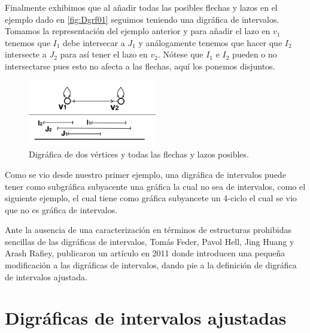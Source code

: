 Finalmente exhibimos que al añadir todas las posibles flechas y lazos en el
ejemplo dado en \cref{fig:Dgrf01} seguimos teniendo una digr\'afica de
intervalos. Tomamos la representaci\'on del ejemplo anterior y para añadir el
lazo en $v_1$ tenemos que $I_1$ debe intersecar a $J_1$ y an\'alogamente tenemos
que hacer que $I_2$ intersecte a $J_2$ para así tener el lazo en $v_2$. N\'otese
que $I_1$ e $I_2$ pueden o no intersectarse pues esto no afecta a las flechas,
aquí los ponemos disjuntos.

\begin{figure}[H]
  \centering
  \includegraphics[width=0.5\textwidth]{recursos/capturas/Digraf4.jpg}
  \caption{Digr\'afica de dos v\'ertices y todas las flechas y lazos posibles.}
  \label{fig:Dgrf04}
\end{figure}
 
Como se vio desde nuestro primer ejemplo, una digr\'afica de intervalos puede
tener como subgr\'afica subyacente una gr\'afica la cual no sea de intervalos,
como el siguiente ejemplo, el cual tiene como gr\'afica subyancete un 4-ciclo el
cual se vio que no es gr\'afica de intervalos. 

Ante la ausencia de una caracterizaci\'on en t\'erminos de estructuras
prohibidas sencillas de las digr\'aficas de intervalos, Tom\'as Feder, Pavol
Hell, Jing Huang y Arash Rafiey, publicaron un artículo en 2011 donde introducen
una pequeña modificaci\'on a las digr\'aficas de intervalos, dando pie a la
definici\'on de digr\'afica de intervalos ajustada.


\section{Digr\'aficas de intervalos ajustadas}

